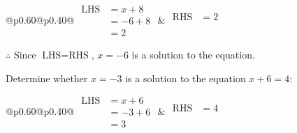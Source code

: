 \documentclass[12pt]{article}
\newcounter{minipagecount}
\begin{document}
\begin{multicols}{2}
\begin{minipage}[t]{0.40\textwidth}
    \noindent
    \renewcommand{\arraystretch}{1.3} %
    \begin{tabular}{@{}p{0.60\linewidth}@{}p{0.40\linewidth}@{}}
        \(\begin{aligned}
            \text{LHS} &= x + 8 \\
                    &= -6 + 8 \\
                    &= 2
        \end{aligned}\) &
        \(\begin{aligned}
            \text{RHS} &= 2\\
                    & \\
                    &
        \end{aligned}\)
    \end{tabular}
    \renewcommand{\arraystretch}{1.0} %
    \vspace{2pt}  %

    \noindent \(\therefore\) Since \(\text{LHS} = \text{RHS}\), \(x = -6\) is  a solution to the equation.

\end{minipage}

 \vspace*{16pt}
\columnbreak
\noindent{(\theminipagecount)}\hspace{0.1mm} %
\begin{minipage}[t]{0.40\textwidth} %

    \noindent Determine whether \(x = -3\) is a solution to the equation \(x + 6 = 4\):
    \vspace{4pt}  %

    \noindent
    \renewcommand{\arraystretch}{1.3} %
    \begin{tabular}{@{}p{0.60\linewidth}@{}p{0.40\linewidth}@{}}
        \(\begin{aligned}
            \text{LHS} &= x + 6 \\
                    &= -3 + 6 \\
                    &= 3
        \end{aligned}\) &
        \(\begin{aligned}
            \text{RHS} &= 4\\
                    & \\
                    &
        \end{aligned}\)
    \end{tabular}
    \renewcommand{\arraystretch}{1.0} %
    \vspace{2pt}  %


\end{minipage}
\end{multicols}
\end{document}
